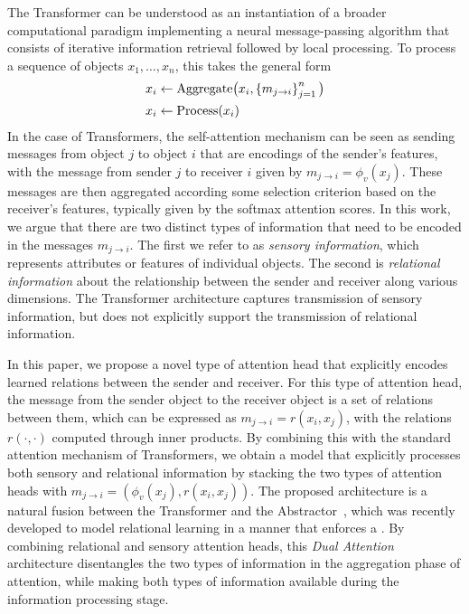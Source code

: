 The Transformer can be understood as an instantiation of a broader computational paradigm implementing a neural message-passing algorithm that consists of iterative information retrieval followed by local processing. To process a sequence of objects $x_1,\ldots, x_n$, this takes the general form
\begin{equation}\label{eq:intro_message_passing}
  \begin{split}
    x_i &\gets \mathrm{Aggregate}\big(x_i, \left\{m_{j \to i}\right\}_{j=1}^{n}\big) \\
    x_i &\gets \mathrm{Process}(x_i)
  \end{split}
\end{equation}
In the case of Transformers, the self-attention mechanism can be seen as sending messages from object $j$ to object $i$ that are encodings of the sender's features, with the message from sender $j$ to receiver $i$ given by $m_{j \to i} = \phi_v(x_j)$. These messages are then aggregated according some selection criterion based on the receiver's features,  typically given by the softmax attention scores. In this work, we argue that there are two distinct types of information that need to be encoded in the messages $m_{j \to i}$. The first we refer to as \textit{sensory information}, which represents attributes or features of individual objects. The second is \textit{relational information} about the relationship between the sender and receiver along various dimensions. The Transformer architecture captures transmission of sensory information, but does not explicitly support the transmission of relational information.

In this paper, we propose a novel type of attention head that explicitly encodes learned  relations between the sender and receiver. For this type of attention head, the message from the sender object to the receiver object is a set of relations between them, which can be expressed as $m_{j \to i} = r(x_i, x_j)$, with the relations $r(\cdot,\cdot)$ computed through inner products. By combining this with the standard attention mechanism of Transformers, we obtain a model that explicitly processes both sensory and relational information by stacking the two types of attention heads with $m_{j \to i} = (\phi_v(x_j), r(x_i, x_j))$. The proposed architecture is a natural fusion between the Transformer and the Abstractor~\citep{altabaa2024abstractors}, which was recently developed to model relational learning in a manner that enforces a  \citep{webbRelationalBottleneckInductive2024}. By combining relational and sensory attention heads, this \textit{Dual Attention} architecture disentangles the two types of information in the aggregation phase of attention, while making both types of information available during the information processing stage.

